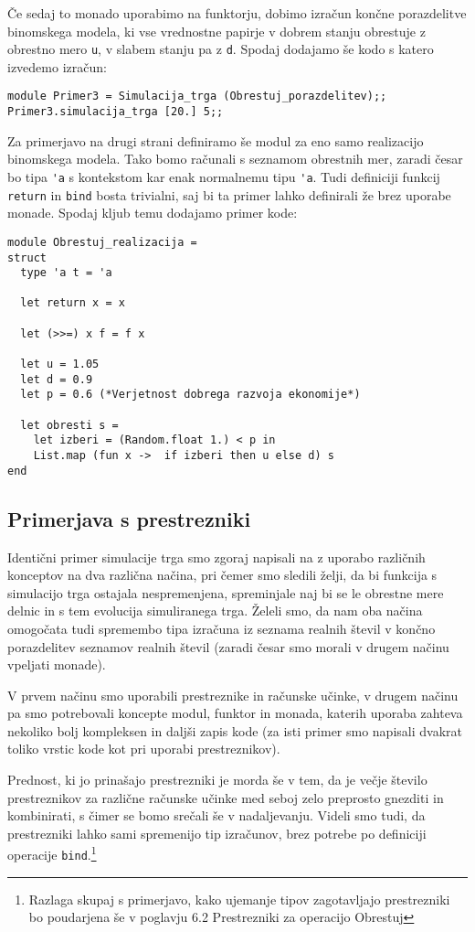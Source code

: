 \documentclass[a4paper,12pt]{article}
\theoremstyle{definition} %
\begin{document}
Če sedaj to monado uporabimo na funktorju, dobimo izračun končne porazdelitve binomskega modela, ki vse vrednostne papirje v dobrem stanju obrestuje z obrestno mero \lstinline{u}, v slabem stanju pa z \lstinline{d}. Spodaj dodajamo še kodo s katero izvedemo izračun:
\begin{lstlisting}
module Primer3 = Simulacija_trga (Obrestuj_porazdelitev);;
Primer3.simulacija_trga [20.] 5;;
\end{lstlisting}
Za primerjavo na drugi strani definiramo še modul za eno samo realizacijo binomskega modela. Tako bomo računali s seznamom obrestnih mer, zaradi česar bo tipa \lstinline{'a} s kontekstom kar enak normalnemu tipu \lstinline{'a}. Tudi definiciji funkcij \lstinline{return} in \lstinline{bind} bosta trivialni, saj bi ta primer lahko definirali že brez uporabe monade. Spodaj kljub temu dodajamo primer kode:
\begin{lstlisting}
module Obrestuj_realizacija =
struct
  type 'a t = 'a

  let return x = x

  let (>>=) x f = f x

  let u = 1.05
  let d = 0.9
  let p = 0.6 (*Verjetnost dobrega razvoja ekonomije*)

  let obresti s =
    let izberi = (Random.float 1.) < p in
    List.map (fun x ->  if izberi then u else d) s
end
\end{lstlisting}

\subsection{Primerjava s prestrezniki}

Identični primer simulacije trga smo zgoraj napisali na z uporabo različnih konceptov na dva različna načina, pri čemer smo sledili želji, da bi funkcija s simulacijo trga ostajala nespremenjena, spreminjale naj bi se le obrestne mere delnic in s tem evolucija simuliranega trga.
Želeli smo, da nam oba načina omogočata tudi spremembo tipa izračuna iz seznama realnih števil v končno porazdelitev seznamov realnih števil (zaradi česar smo morali v drugem načinu vpeljati monade).

V prvem načinu smo uporabili prestreznike in računske učinke, v drugem načinu pa smo potrebovali koncepte modul, funktor in monada, katerih uporaba zahteva nekoliko bolj kompleksen in daljši zapis kode (za isti primer smo napisali dvakrat toliko vrstic kode kot pri uporabi prestreznikov). 

Prednost, ki jo prinašajo prestrezniki je morda še v tem, da je večje število prestreznikov za različne računske učinke med seboj zelo preprosto gnezditi in kombinirati, s čimer se bomo srečali še v nadaljevanju. Videli smo tudi, da prestrezniki lahko sami spremenijo tip izračunov, brez potrebe po definiciji operacije \lstinline{bind}.\footnote{Razlaga skupaj s primerjavo, kako ujemanje tipov zagotavljajo prestrezniki bo poudarjena še v poglavju 6.2 Prestrezniki za operacijo Obrestuj}
\end{document}
